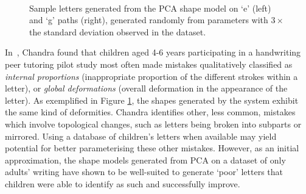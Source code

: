 \documentclass{sig-alternate}
\begin{document}
\begin{figure}[thpb]
\centering
{}
~~~~~
\caption[Sample letters generated from the PCA shape model on `e' and `g'
paths.]{\label{fig:sampleLetters}Sample letters generated from the PCA shape
model on `e' (left) and `g' paths (right), generated randomly from
parameters with $3\times$ the standard deviation observed in the dataset.}

\end{figure}

In~\cite{Chandra2013}, Chandra found that children aged 4-6 years participating
in a handwriting peer tutoring pilot study most often made mistakes
qualitatively classified as \emph{internal proportions} (inappropriate 
proportion of the different strokes within a letter), or \emph{global 
deformations} (overall deformation in the appearance of the letter). As 
exemplified in Figure \ref{fig:sampleLetters}, the shapes generated by the 
system exhibit the same kind of deformities. Chandra identifies other, less 
common, mistakes which involve topological changes, such as letters being 
broken into subparts or mirrored. Using a database of
children's letters when available may yield potential for better parameterising
these other mistakes. However, as an initial approximation, the shape models
generated from PCA on a dataset of only adults' writing have shown to be
well-suited to generate `poor' letters that children were able to identify as
such and successfully improve.
\end{document}
